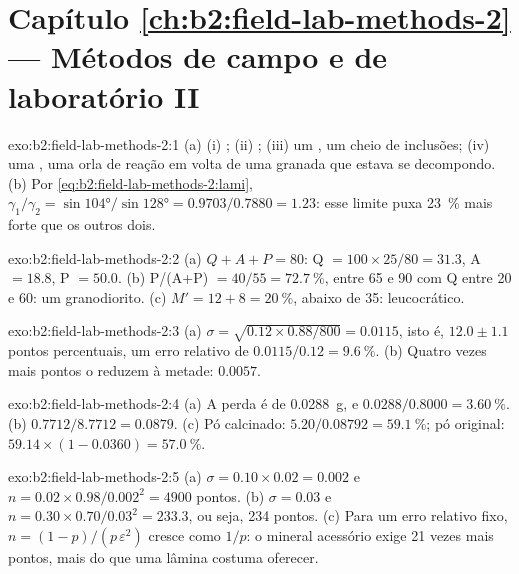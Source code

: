 \section*{Capítulo \ref{ch:b2:field-lab-methods-2} --- Métodos de campo e de laboratório II}

\begin{solution}{exo:b2:field-lab-methods-2:1}
(a) (i) ; (ii) ; (iii) um , um  cheio de
inclusões; (iv) uma , uma orla de reação em volta de uma granada que estava se decompondo. (b) Por
\eqref{eq:b2:field-lab-methods-2:lami}, $\gamma_1/\gamma_2 = \sin\ang{104}/\sin\ang{128} =
0.9703/0.7880 = 1.23$: esse limite puxa \qty{23}{\percent} mais forte que os outros dois.
\end{solution}

\begin{solution}{exo:b2:field-lab-methods-2:2}
(a) $Q + A + P = 80$: Q $= 100 \times 25/80 = 31.3$, A $= 18.8$, P $= 50.0$. (b) P/(A+P) $=
40/55 = \qty{72.7}{\percent}$, entre 65 e 90 com Q entre 20 e 60: um granodiorito.
(c) $M' = 12 + 8 = \qty{20}{\percent}$, abaixo de 35: leucocrático.
\end{solution}

\begin{solution}{exo:b2:field-lab-methods-2:3}
(a) $\sigma = \sqrt{0.12 \times 0.88/800} = 0.0115$, isto é, $12.0 \pm 1.1$ pontos percentuais, um
erro relativo de $0.0115/0.12 = \qty{9.6}{\percent}$. (b) Quatro vezes mais pontos o reduzem à metade: $0.0057$.
\end{solution}

\begin{solution}{exo:b2:field-lab-methods-2:4}
(a) A perda é de \qty{0.0288}{g}, e $0.0288/0.8000 = \qty{3.60}{\percent}$.
(b) $0.7712/8.7712 = 0.0879$.
(c) Pó calcinado: $5.20/0.08792 = \qty{59.1}{\percent}$; pó original:
$59.14 \times (1 - 0.0360) = \qty{57.0}{\percent}$.
\end{solution}

\begin{solution}{exo:b2:field-lab-methods-2:5}
(a) $\sigma = 0.10 \times 0.02 = 0.002$ e $n = 0.02 \times 0.98/0.002^2 = 4900$ pontos.
(b) $\sigma = 0.03$ e $n = 0.30 \times 0.70/0.03^2 = 233.3$, ou seja, 234 pontos. (c) Para um erro relativo
fixo, $n = (1-p)/(p\,\varepsilon^2)$ cresce como $1/p$: o mineral acessório exige 21 vezes mais
pontos, mais do que uma lâmina costuma oferecer.
\end{solution}

